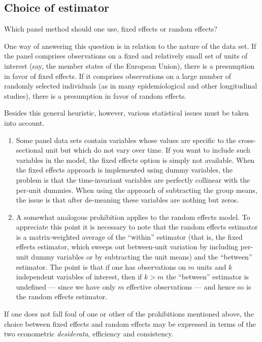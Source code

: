 \subsection{Choice of estimator}
\label{panel-choice}

Which panel method should one use, fixed effects or random effects?

One way of answering this question is in relation to the nature of the
data set.  If the panel comprises observations on a fixed and
relatively small set of units of interest (say, the member states of
the European Union), there is a presumption in favor of fixed effects.
If it comprises observations on a large number of randomly selected
individuals (as in many epidemiological and other longitudinal
studies), there is a presumption in favor of random effects.

Besides this general heuristic, however, various statistical
issues must be taken into account.

\begin{enumerate}

\item Some panel data sets contain variables whose values are specific
  to the cross-sectional unit but which do not vary over time.  If you
  want to include such variables in the model, the fixed effects
  option is simply not available.  When the fixed effects approach is
  implemented using dummy variables, the problem is that the
  time-invariant variables are perfectly collinear with the per-unit
  dummies.  When using the approach of subtracting the group means,
  the issue is that after de-meaning these variables are nothing but
  zeros.
\item A somewhat analogous prohibition applies to the random effects
  model.  To appreciate this point it is necessary to note that the
  random effects estimator is a matrix-weighted average of the
  ``within'' estimator (that is, the fixed effects estimator, which
  sweeps out between-unit variation by including per-unit dummy
  variables or by subtracting the unit means) and the ``between''
  estimator.  The point is that if one has observations on $m$ units
  and $k$ independent variables of interest, then if $k>m$ the
  ``between'' estimator is undefined --- since we have only $m$
  effective observations --- and hence so is the random effects
  estimator.
\end{enumerate}

If one does not fall foul of one or other of the prohibitions
mentioned above, the choice between fixed effects and random effects
may be expressed in terms of the two econometric \textit{desiderata},
efficiency and consistency.  

